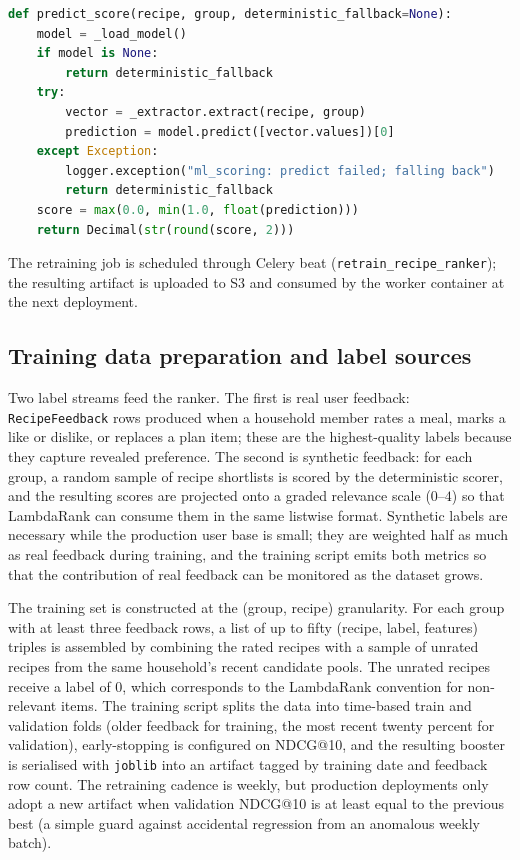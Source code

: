 \begin{lstlisting}[language={Python},caption={Inference-time entry point of the LightGBM scorer.},label={lst:scorer}]
def predict_score(recipe, group, deterministic_fallback=None):
    model = _load_model()
    if model is None:
        return deterministic_fallback
    try:
        vector = _extractor.extract(recipe, group)
        prediction = model.predict([vector.values])[0]
    except Exception:
        logger.exception("ml_scoring: predict failed; falling back")
        return deterministic_fallback
    score = max(0.0, min(1.0, float(prediction)))
    return Decimal(str(round(score, 2)))
\end{lstlisting}

The retraining job is scheduled through Celery beat (\texttt{retrain\_recipe\_ranker}); the resulting artifact is uploaded to S3 and consumed by the worker container at the next deployment.

\subsection{Training data preparation and label sources}

Two label streams feed the ranker. The first is real user feedback: \texttt{RecipeFeedback} rows produced when a household member rates a meal, marks a like or dislike, or replaces a plan item; these are the highest-quality labels because they capture revealed preference. The second is synthetic feedback: for each group, a random sample of recipe shortlists is scored by the deterministic scorer, and the resulting scores are projected onto a graded relevance scale ($0$--$4$) so that LambdaRank can consume them in the same listwise format. Synthetic labels are necessary while the production user base is small; they are weighted half as much as real feedback during training, and the training script emits both metrics so that the contribution of real feedback can be monitored as the dataset grows.

The training set is constructed at the (group, recipe) granularity. For each group with at least three feedback rows, a list of up to fifty (recipe, label, features) triples is assembled by combining the rated recipes with a sample of unrated recipes from the same household's recent candidate pools. The unrated recipes receive a label of $0$, which corresponds to the LambdaRank convention for non-relevant items. The training script splits the data into time-based train and validation folds (older feedback for training, the most recent twenty percent for validation), early-stopping is configured on NDCG@10, and the resulting booster is serialised with \texttt{joblib} into an artifact tagged by training date and feedback row count. The retraining cadence is weekly, but production deployments only adopt a new artifact when validation NDCG@10 is at least equal to the previous best (a simple guard against accidental regression from an anomalous weekly batch).

